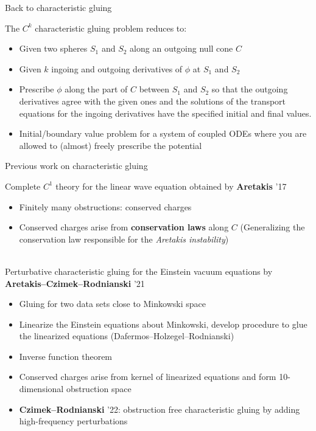 \documentclass[compress,usenames,dvipsnames,8pt]{beamer}
\theoremstyle{definition}
\renewcommand{\(}{\begin{columns}}
\renewcommand{\)}{\end{columns}}
\newcommand{\<}[1]{\begin{column}{#1}}
\renewcommand{\>}{\end{column}}
\begin{document}
\begin{frame}{Back to characteristic gluing }


\begin{figure}
 \def\svgwidth{10pc}

\end{figure}

The $C^k$ characteristic gluing problem reduces to: \pause

\begin{itemize}
\item Given two spheres $S_1$ and $S_2$ along an outgoing null cone $C$
\item Given $k$ ingoing and outgoing derivatives of $\phi$ at $S_1$ and $S_2$ \pause
\item Prescribe $\phi$ along the part of $C$ between $S_1$ and $S_2$ so that the outgoing derivatives agree with the given ones and the solutions of the transport equations for the ingoing derivatives have the specified initial and final values. \pause
\item Initial/boundary value problem for a system of coupled ODEs where you are allowed to (almost) freely prescribe the potential
\end{itemize}

\end{frame}

\begin{frame}{Previous work on characteristic gluing}

Complete $C^1$ theory for the linear wave equation obtained by \textbf{Aretakis} '17 
\begin{itemize}
\item Finitely many obstructions: conserved charges \pause
\item Conserved charges arise from \textbf{conservation laws} along $C$ ({\footnotesize{Generalizing the conservation law responsible for the \emph{Aretakis instability}}})\pause
\end{itemize}

~\\ 

Perturbative characteristic gluing for the Einstein vacuum equations by \textbf{Aretakis--Czimek--Rodnianski} '21
\begin{itemize}
\item Gluing for two data sets close to Minkowski space \pause
\item Linearize the Einstein equations about Minkowski, develop procedure to glue the linearized equations ({\footnotesize{Dafermos--Holzegel--Rodnianski}})
\item Inverse function theorem \pause
\item Conserved charges arise from kernel of linearized equations and form 10-dimensional obstruction space \pause
\item \textbf{Czimek--Rodnianski} '22: obstruction free characteristic gluing by adding high-frequency perturbations 
\end{itemize}

\end{frame}
\end{document}
